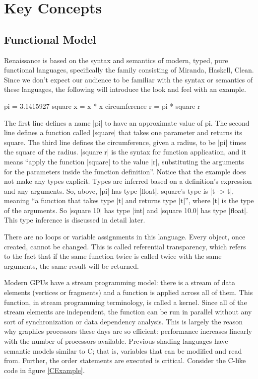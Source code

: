 \documentclass{acmsiggraph}               %
\begin{document}
\section{Key Concepts}

\subsection{Functional Model}

Renaissance is based on the syntax and semantics of modern, typed,
pure functional languages, specifically the family consisting of
Miranda, Haskell, Clean.  Since we don't expect our audience to be
familiar with the syntax or semantics of these languages, the
following will introduce the look and feel with an example.

\begin{MyVerb}
pi = 3.1415927
square x = x * x
circumference r = pi * square r
\end{MyVerb}

The first line defines a name |pi| to have an approximate value of pi.
The second line defines a function called |square| that takes one
parameter and returns its square.  The third line defines the
circumference, given a radius, to be |pi| times the square of the
radius.  |square r| is the syntax for function application, and it
means ``apply the function |square| to the value |r|, substituting the
arguments for the parameters inside the function definition''.  Notice
that the example does not make any types explicit.  Types are inferred
based on a definition's expression and any arguments.  So, above, |pi|
has type |float|.  square's type is |t -> t|, meaning ``a function
that takes type |t| and returns type |t|'', where |t| is the type of
the arguments.  So |square 10| has type |int| and |square 10.0| has
type |float|.  This type inference is discussed in detail later.

There are no loops or variable assignments in this language.  Every
object, once created, cannot be changed.  This is called referential
transparency, which refers to the fact that if the same function twice
is called twice with the same arguments, the same result will be
returned.

Modern GPUs have a stream programming model: there is a stream of data
elements (vertices or fragments) and a function is applied across all
of them.  This function, in stream programming terminology, is called
a kernel.  Since all of the stream elements are independent, the
function can be run in parallel without any sort of synchronization or
data dependency analysis.  This is largely the reason why graphics
processors these days are so efficient: performance increases linearly
with the number of processors available.  Previous shading languages
have semantic models similar to C; that is, variables that can be
modified and read from.  Further, the order statements are executed is
critical.  Consider the C-like code in figure \ref{CExample}.
\end{document}
